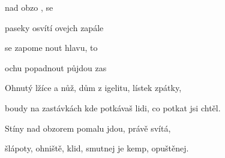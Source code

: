 

\zs
{} nad obzo ,
 se 

paseky osvítí ovejch  
zapále
\ks

\zr
{} se zapome
nout hlavu, to 

ochu popadnout  půjdou zas 
\kr

\zs
Ohnutý lžíce a nůž, dům z igelitu, lístek zpátky,

boudy na zastávkách kde potkávaš lidi,
co potkat jsi chtěl.
\ks

\zr \kr

\zs
Stíny nad obzorem pomalu jdou, právě svítá,

šlápoty, ohniště, klid,
smutnej je kemp, opuštěnej.
\ks

\zr \kr

\kp





